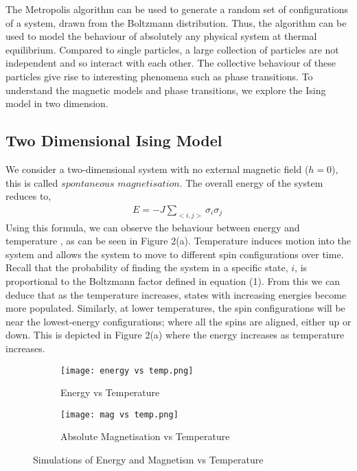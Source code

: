 \documentclass[a4paper]{article}
\begin{document}
The Metropolis algorithm can be used to generate a random set of configurations of a system, drawn from the Boltzmann distribution. Thus, the algorithm can be used to model the behaviour of absolutely any physical system at thermal equilibrium. Compared to single particles, a large collection of particles are not independent and so interact with each other. The collective behaviour of these particles give rise to interesting phenomena such as phase transitions. To understand the magnetic models and phase transitions, we explore the Ising model in two dimension.

\subsection{Two Dimensional Ising Model}

We consider a two-dimensional system with no external magnetic field ($h=0$), this is called $spontaneous$ $magnetisation$. The overall energy of the system reduces to,
\begin{align}
E = -J\sum_{<i,j>} \sigma_{i}\sigma_{j} \
\end{align}
Using this formula, we can observe the behaviour between energy and temperature \cite{8}, as can be seen in Figure 2(a). Temperature induces motion into the system and allows the system to move to different spin configurations over time. Recall that the probability of finding the system in a specific state, $i$, is proportional to the Boltzmann factor defined in equation (1). From this we can deduce that as the temperature increases, states with increasing energies become more populated. Similarly, at lower temperatures, the spin configurations will be near the lowest-energy configurations; where all the spins are aligned, either up or down. This is depicted in Figure 2(a) where the energy increases as temperature increases.

\begin{figure}[h]
\centering
\begin{subfigure}{0.5\textwidth}
\texttt{[image: energy vs temp.png]} 
\caption{Energy vs Temperature}
\label{fig:subim1}
\end{subfigure}
\begin{subfigure}{0.425\textwidth}
\texttt{[image: mag vs temp.png]}
\caption{Absolute Magnetisation vs Temperature}
\label{fig:subim2}
\end{subfigure}
\caption{Simulations of Energy and Magnetism vs Temperature}
\label{fig:image2}
\end{figure}
\end{document}
